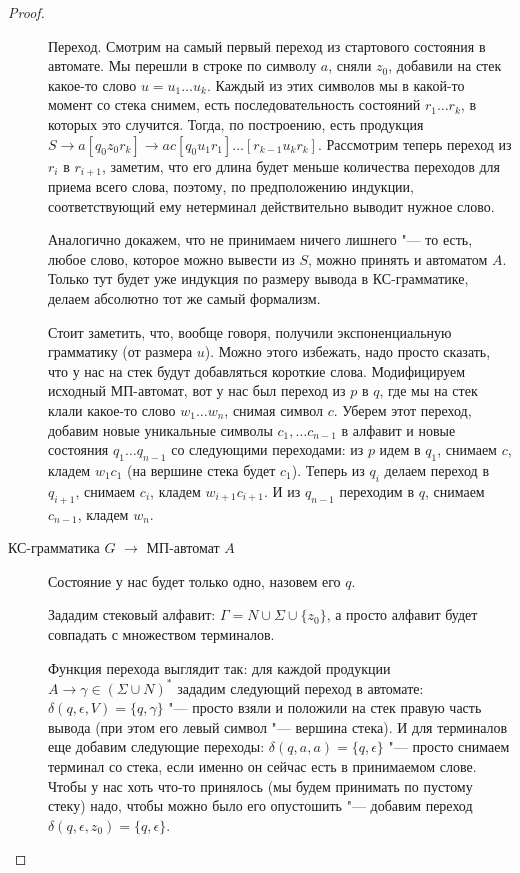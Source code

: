 \begin{proof}
\begin{description}
    Переход. Смотрим на самый первый переход из стартового состояния в автомате. 
    Мы перешли в строке по символу $a$, сняли $z_0$, добавили на стек какое-то слово $u=u_1\dots u_k$.
    Каждый из этих символов мы в какой-то момент со стека снимем, есть последовательность состояний $r_1 \dots r_k$, в которых это случится. 
    Тогда, по построению, есть продукция $S \to a [q_0 z_0 r_k] \to a c [q_0 u_1 r_1] \dots [r_{k-1} u_k r_k]$. 
    Рассмотрим теперь переход из $r_i$ в $r_{i+1}$, заметим, что его длина будет меньше количества переходов для приема всего слова, поэтому, по предположению индукции, 
    соответствующий ему нетерминал действительно выводит нужное слово.

    Аналогично докажем, что не принимаем ничего лишнего "--- то есть, любое слово, которое можно вывести из $S$, можно принять и автоматом $A$. 
    Только тут будет уже индукция по размеру вывода в КС-грамматике, делаем абсолютно тот же самый формализм.

    Стоит заметить, что, вообще говоря, получили экспоненциальную грамматику (от размера $u$). 
    Можно этого избежать, надо просто сказать, что у нас на стек будут добавляться короткие слова. 
    Модифицируем исходный МП-автомат, вот у нас был переход из $p$ в $q$, где мы на стек клали какое-то слово $w_1 \dots w_n$, снимая символ $c$. 
    Уберем этот переход, добавим новые уникальные символы $c_1, \dots c_{n-1}$ в алфавит и новые состояния $q_1 \dots q_{n-1}$ со следующими переходами:
    из $p$ идем в $q_1$, снимаем $c$, кладем $w_1c_1$ (на вершине стека будет $c_1$).
    Теперь из $q_i$ делаем переход в $q_{i+1}$, снимаем $c_i$, кладем $w_{i + 1}c_{i+1}$. 
    И из $q_{n-1}$ переходим в $q$, снимаем $c_{n-1}$, кладем $w_n$.

    \item[КС-грамматика $G$ $\to$ МП-автомат $A$]
    Состояние у нас будет только одно, назовем его $q$.

    Зададим стековый алфавит: $\Gamma = N \cup \Sigma \cup \{z_0\}$, а просто алфавит будет совпадать с множеством терминалов.

    Функция перехода выглядит так: для каждой продукции $A \to \gamma \in (\Sigma \cup N)^*$ зададим следующий переход в автомате: $\delta(q, \epsilon, V) = \{q, \gamma\}$ "---
    просто взяли и положили на стек правую часть вывода (при этом его левый символ "--- вершина стека).
    И для терминалов еще добавим следующие переходы: $\delta(q, a, a) = \{q, \epsilon\}$ "--- просто снимаем терминал со стека, если именно он сейчас есть в принимаемом слове.
    Чтобы у нас хоть что-то принялось (мы будем принимать по пустому стеку) надо, чтобы можно было его опустошить "--- добавим переход $\delta(q, \epsilon, z_0) = \{q, \epsilon\}$.


\end{description}
\end{proof}

